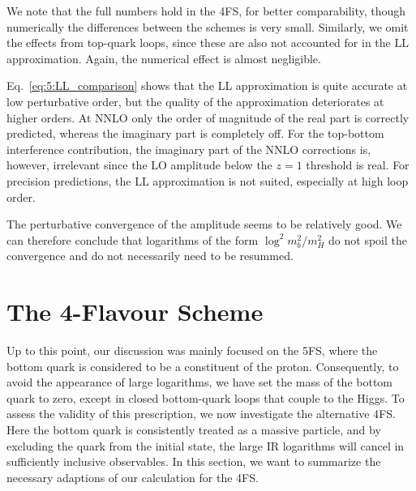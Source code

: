 We note that the full numbers hold in the 4\acs{FS}, for better comparability, though numerically the differences between the schemes is very small. Similarly, we omit the effects from top-quark loops, since these are also not accounted for in the \acs{LL} approximation. Again, the numerical effect is almost negligible.

Eq.~\eqref{eq:5:LL_comparison} shows that the \acs{LL} approximation is quite accurate at low perturbative order, but the quality of the approximation deteriorates at higher orders. At \acs{NNLO} only the order of magnitude of the real part is correctly predicted, whereas the imaginary part is completely off. For the top-bottom interference contribution, the imaginary part of the \acs{NNLO} corrections is, however, irrelevant since the \acs{LO} amplitude below the $z=1$ threshold is real. For precision predictions, the \acs{LL} approximation is not suited, especially at high loop order.

The perturbative convergence of the amplitude seems to be relatively good. We can therefore conclude that logarithms of the form $\log^2 m_b^2/m_H^2$ do not spoil the convergence and do not necessarily need to be resummed.



\section{The 4-Flavour Scheme}\label{sec:5:4FS}
Up to this point, our discussion was mainly focused on the 5\acs{FS}, where the bottom quark is considered to be a constituent of the proton. Consequently, to avoid the appearance of large logarithms, we have set the mass of the bottom quark to zero, except in closed bottom-quark loops that couple to the Higgs. To assess the validity of this prescription, we now investigate the alternative 4\acs{FS}. Here the bottom quark is consistently treated as a massive particle, and by excluding the quark from the initial state, the large \acs{IR} logarithms will cancel in sufficiently inclusive observables. In this section, we want to summarize the necessary adaptions of our calculation for the 4\acs{FS}.

